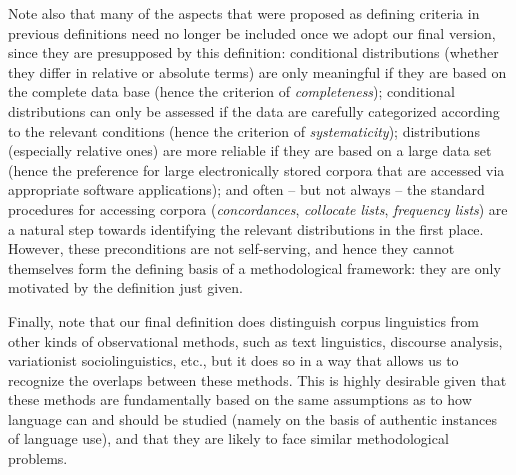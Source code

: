 Note also that many of the aspects that were proposed as defining criteria in previous definitions need no longer be included once we adopt our final version, since they are presupposed by this definition: conditional distributions  (whether they differ in relative or absolute terms) are only meaningful if they are based on the complete data base (hence the criterion of \emph{completeness}); conditional distributions  can only be assessed if the data are carefully categorized  according to the relevant conditions (hence the criterion of \emph{systematicity}); distributions (especially relative ones) are more reliable  if they are based on a large  data set (hence the preference for large electronically stored corpora that are accessed via appropriate software applications); and often -- but not always -- the standard procedures for accessing corpora (\emph{concordances},  \emph{collocate lists},  \emph{frequency lists})  are a natural step towards identifying the relevant distributions in the first place. However, these preconditions are not self\hyp{}serving, and hence they cannot themselves form the defining basis of a methodological framework: they are only motivated by the definition just given.

Finally, note that our final definition does distinguish corpus linguistics from other kinds of observational  methods, such as text linguistics, discourse analysis, variationist sociolinguistics,  etc., but it does so in a way that allows us to recognize the overlaps between these methods. This is highly desirable given that these methods are fundamentally based on the same assumptions as to how language can and should be studied (namely on the basis of authentic  instances of language use), and that they are likely to face similar methodological problems.

